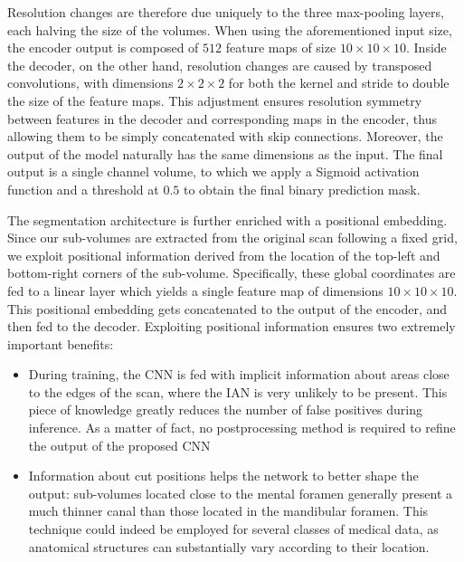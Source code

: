 Resolution changes are therefore due uniquely to the three max-pooling layers,
each halving the size of the volumes. When using the aforementioned input size,
the encoder output is composed of $512$ feature maps of size $10 \times 10
\times 10$. Inside the decoder, on the other hand, resolution changes are caused
by transposed convolutions, with dimensions $2 \times 2 \times 2$ for both the
kernel and stride to double the size of the feature maps. This adjustment
ensures resolution symmetry between features in the decoder and corresponding
maps in the encoder, thus allowing them to be simply concatenated with skip
connections. Moreover, the output of the model naturally has the same dimensions
as the input. The final output is a single channel volume, to which we apply a
Sigmoid activation function and a threshold at $0.5$ to obtain the final binary
prediction mask.

The segmentation architecture is further enriched with a positional embedding.
Since our sub-volumes are extracted from the original scan following a fixed
grid, we exploit positional information derived from the location of the
top-left and bottom-right corners of the sub-volume. Specifically, these global
coordinates are fed to a linear layer which yields a single feature map of
dimensions $10 \times 10 \times 10$. This positional embedding gets concatenated
to the output of the encoder, and then fed to the decoder. Exploiting positional
information ensures two extremely important benefits:
\begin{itemize}
  \item{During training, the CNN is fed with implicit information about areas
  close to the edges of the scan, where the IAN is very unlikely to be present.
  This piece of knowledge greatly reduces the number of false positives during
  inference. As a matter of fact, no postprocessing method is required to refine
  the output of the proposed CNN}
  \item{Information about cut positions helps the network to better shape the
  output: sub-volumes located close to the mental foramen generally present a
  much thinner canal than those located in the mandibular foramen. This
  technique could indeed be employed for several classes of medical data, as
  anatomical structures can substantially vary according to their location.}
\end{itemize}

